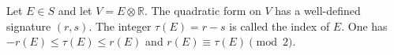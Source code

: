 Let $E \in S$ and let $V = E \otimes \mathbb{R}$. The quadratic form on $V$ has a well-defined signature $(r,s)$. The integer $\tau(E) = r - s$ is called the index of $E$. One has $-r(E) \leq \tau(E) \leq r(E)$ and $r(E) \equiv \tau(E) \pmod{2}$.
